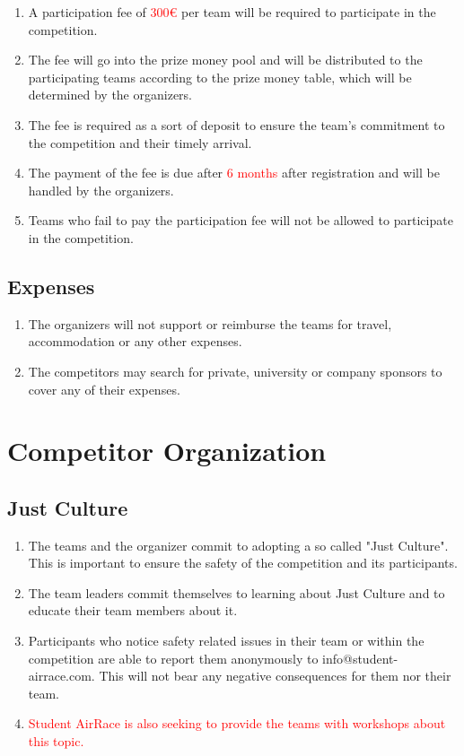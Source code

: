     \begin{enumerate}
    \item A participation fee of \textcolor{red}{300€} per team will be required to participate in the competition.
    \item The fee will go into the prize money pool and will be distributed to the participating teams according to the prize money table, which will be determined by the organizers.
    \item The fee is required as a sort of deposit to ensure the team's commitment to the competition and their timely arrival.
    \item The payment of the fee is due after \textcolor{red}{6 months} after registration and will be handled by the organizers.
    \item Teams who fail to pay the participation fee will not be allowed to participate in the competition.
    \end{enumerate}

    \subsection{Expenses}
    \begin{enumerate}
      \item The organizers will not support or reimburse the teams for travel, accommodation or any other expenses. 
      \item The competitors may search for private, university or company sponsors to cover any of their expenses.
    \end{enumerate}

    \section{Competitor Organization}

    \subsection{Just Culture}
    \begin{enumerate}
      \item The teams and the organizer commit to adopting a so called "Just Culture". This is important to ensure the safety of the competition and its participants.
      \item The team leaders commit themselves to learning about Just Culture and to educate their team members about it.
      \item Participants who notice safety related issues in their team or within the competition are able to report them anonymously  to info@student-airrace.com. This will not bear any
      negative consequences for them nor their team. 
      \item \textcolor{red}{Student AirRace is also seeking to provide the teams with workshops about this topic.}
    \end{enumerate}

